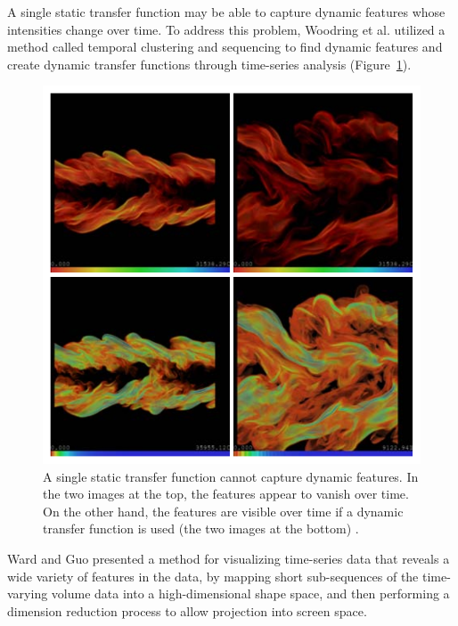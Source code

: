 A single static transfer function may be able to capture dynamic features whose intensities change over time.
To address this problem, Woodring et al. \cite{woodring_semi-automatic_2009} utilized a method called temporal clustering and sequencing to find dynamic features and create dynamic transfer functions through time-series analysis (Figure~\ref{fig:woodring_semi-automatic_2009}).

\begin{figure}
	\centering
	\includegraphics[width=1\linewidth]{images/woodring_semi-automatic_2009}
	\caption[A single static transfer function cannot capture dynamic features.]{A single static transfer function cannot capture dynamic features. In the two images at the top, the features appear to vanish over time. On the other hand, the features are visible over time if a dynamic transfer function is used (the two images at the bottom) \cite{woodring_semi-automatic_2009}.}
	\label{fig:woodring_semi-automatic_2009}
\end{figure}

Ward and Guo \cite{ward_visual_2011} presented a method for visualizing time-series data that reveals a wide variety of features in the data, by mapping short sub-sequences of the time-varying volume data into a high-dimensional shape space, and then performing a dimension reduction process to allow projection into screen space.

